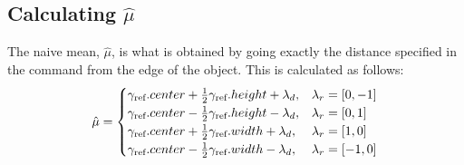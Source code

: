\documentclass[12pt,letterpaper]{article}
\newcommand\refobj{\textmd{ref}}
\begin{document}
\subsection*{Calculating $\hat{\mu}$}
The naive mean, $\hat{\mu}$, is what is obtained by going exactly the distance specified in the command from the edge of the object. This is calculated as follows:
\[
\hat{\mu} = \begin{cases} 
\gamma_\refobj.center + \frac{1}{2}\gamma_\refobj.height + \lambda_d, & \lambda_r = [0, -1] \\
\gamma_\refobj.center - \frac{1}{2}\gamma_\refobj.height - \lambda_d, & \lambda_r = [0, 1] \\
\gamma_\refobj.center + \frac{1}{2}\gamma_\refobj.width + \lambda_d, & \lambda_r = [1, 0] \\
\gamma_\refobj.center - \frac{1}{2}\gamma_\refobj.width - \lambda_d, & \lambda_r = [-1, 0] 
\end{cases}
\]
\end{document}
